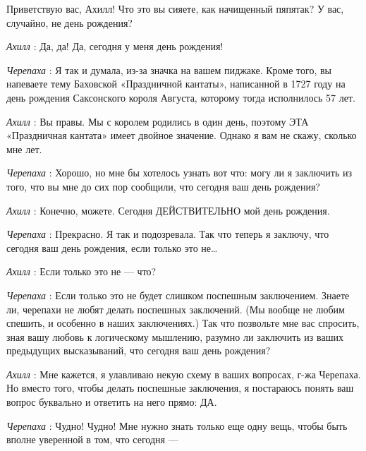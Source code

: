 \documentclass[../main.tex]{subfiles}
\begin{document}


\begin{dialogue}

 Приветствую вас, Ахилл! Что это вы сияете, как начищенный пяпятак? У вас, случайно, не день рождения?

\emph{Ахилл} : Да, да! Да, сегодня у меня день рождения!

\emph{Черепаха} : Я так и думала, из-за значка на вашем пиджаке. Кроме того, вы напеваете тему Баховской «Праздничной кантаты», написанной в 1727 году на день рождения Саксонского короля Августа, которому тогда исполнилось 57 лет.

\emph{Ахилл} : Вы правы. Мы с королем родились в один день, поэтому ЭТА «Праздничная кантата» имеет двойное значение. Однако я вам не скажу, сколько мне лет.

\emph{Черепаха} : Хорошо, но мне бы хотелось узнать вот что: могу ли я заключить из того, что вы мне до сих пор сообщили, что сегодня ваш день рождения?

\emph{Ахилл} : Конечно, можете. Сегодня ДЕЙСТВИТЕЛЬНО мой день рождения.

\emph{Черепаха} : Прекрасно. Я так и подозревала. Так что теперь я заключу, что сегодня ваш день рождения, если только это не\ldots{}

\emph{Ахилл} : Если только это не --- что?

\emph{Черепаха} : Если только это не будет слишком поспешным заключением. Знаете ли, черепахи не любят делать поспешных заключений. (Мы вообще не любим спешить, и особенно в наших заключениях.) Так что позвольте мне вас спросить, зная вашу любовь к логическому мышлению, разумно ли заключить из ваших предыдущих высказываний, что сегодня ваш день рождения?

\emph{Ахилл} : Мне кажется, я улавливаю некую схему в ваших вопросах, г-жа Черепаха. Но вместо того, чтобы делать поспешные заключения, я постараюсь понять ваш вопрос буквально и ответить на него прямо: ДА.

\emph{Черепаха} : Чудно! Чудно! Мне нужно знать только еще одну вещь, чтобы быть вполне уверенной в том, что сегодня ---


\end{dialogue}
\end{document}
